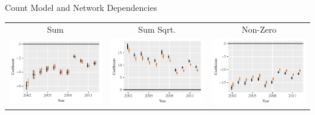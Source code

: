 \documentclass{beamer}
\begin{document}
\begin{frame}{Count Model and Network Dependencies}

\centering
\begin{tabular}{c@{\hskip -.4cm}c@{\hskip -.4cm}c}
Sum & Sum Sqrt.  & Non-Zero  \\
\includegraphics[height=.3\textheight, clip=true, trim=.5cm .5cm 0cm .1cm]{slides_figures/rl_plots/Sum.pdf}    &
\includegraphics[height=.3\textheight, clip=true, trim=.5cm .5cm 0cm .1cm]{slides_figures/rl_plots/Sum_5.pdf}   &
\includegraphics[height=.3\textheight, clip=true, trim=.5cm .5cm 0cm .1cm]{slides_figures/rl_plots/Nonzero.pdf}\\



\end{tabular}
\end{frame}
\end{document}
